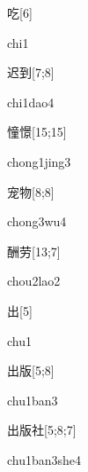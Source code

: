 \begin{verbete}[chi1]{吃}[6]
\begin{pronuncia}{chi1}
\end{pronuncia}
\end{verbete}

\begin{verbete}{迟到}[7;8]
\begin{pronuncia}{chi1dao4}
\end{pronuncia}
\end{verbete}

\begin{verbete}{憧憬}[15;15]
\begin{pronuncia}{chong1jing3}
\end{pronuncia}
\end{verbete}

\begin{verbete}[chong3wu4]{宠物}[8;8]
\begin{pronuncia}{chong3wu4}
\end{pronuncia}
\end{verbete}

\begin{verbete}{酬劳}[13;7]
\begin{pronuncia}{chou2lao2}
\end{pronuncia}
\end{verbete}

\begin{verbete}[chu1]{出}[5]
\begin{pronuncia}{chu1}
\end{pronuncia}
\end{verbete}

\begin{verbete}{出版}[5;8]
\begin{pronuncia}{chu1ban3}
\end{pronuncia}
\end{verbete}

\begin{verbete}{出版社}[5;8;7]
\begin{pronuncia}{chu1ban3she4}
\end{pronuncia}
\end{verbete}

